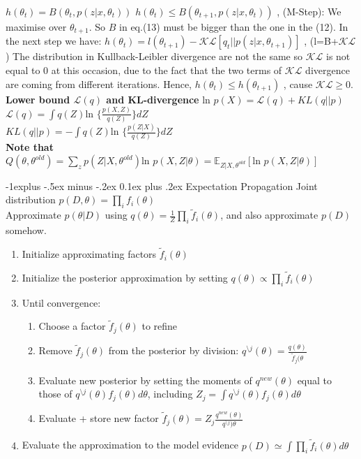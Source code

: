 \documentclass[9pt,landscape]{article}
\makeatletter
\renewcommand{\subsection}{\@startsection{subsection}{2}{0mm}%
                                {-1explus -.5ex minus -.2ex}%
                                {0.1ex plus .2ex}%
                                {\normalfont\scriptsize\bfseries}}
\makeatother
\begin{document}
\begin{multicols}{3}
$
 h(\theta_{t}) = B(\theta_{t},p(z|x,\theta_{t}))
$
$
h(\theta_{t}) \leq B(\theta_{t+1},p(z|x,\theta_{t}))
$
, (M-Step): We maximise over $\theta_{t+1}$. So $B$ in eq.(13) must be bigger than the one in the (12). In the next step we have:
$
h(\theta_{t}) = l(\theta_{t+1})-\mathcal{KL}[q_{t}||p(z|x,\theta_{t+1})]
$
, (l=B+$\mathcal{KL}$) The distribution in Kullback-Leibler divergence are not
the same so $\mathcal{KL}$ is not equal to $0$ at this occasion, due to the
fact that the two terms of $\mathcal{KL}$ divergence are coming from different iterations. Hence,
$
h(\theta_{t}) \leq h(\theta_{t+1})
$
, cause $\mathcal{KL} \geq 0$.\\
\textbf{Lower bound $\mathcal{L}(q)$ and KL-divergence}
$\text{ln } p(X) = \mathcal{L}(q) + KL(q||p)$\\
$\mathcal{L} (q) = \int q(Z) \text{ln } \big\{ \frac{p(X,Z)}{q(Z)} \big\} dZ$ \\
$KL(q||p) = - \int q(Z) \text{ln } \big \{ \frac{p(Z|X)}{q(Z)} \big\} dZ$\\
\textbf{Note that}\\
$Q(\theta,\theta^{old}) = \sum_z p(Z|X,\theta^{old}) \text{ln } p(X,Z|\theta) = \mathbb{E}_{Z|X,\theta^{old}}[\text{ln } p(X,Z|\theta)]$

\subsection{Expectation Propagation}
Joint distribution $p(D,\theta) = \prod_i f_i(\theta)$\\
Approximate $p(\theta|D)$ using $q(\theta) = \frac{1}{Z} \prod_i \tilde f_i(\theta)$, and also approximate $p(D)$ somehow.\\
\begin{enumerate}
\item Initialize approximating factors $\tilde f_i(\theta)$
\item Initialize the posterior approximation by setting $q(\theta)\varpropto \prod_i \tilde f_i(\theta)$
\item Until convergence:
\begin{enumerate}
\item Choose a factor $\tilde f_j(\theta)$ to refine
\item Remove $\tilde f_j(\theta)$ from the posterior by division: $q^{\setminus j}(\theta) = \frac{q(\theta)}{\tilde f_j(\theta}$
\item Evaluate new posterior by setting the moments of $q^{new}(\theta)$ equal to those of $q^{\setminus j}(\theta) f_j(\theta) d\theta$, including $Z_j = \int q^{\setminus j} (\theta) f_j(\theta) d\theta$
\item Evaluate + store new factor $\tilde f_j(\theta) = Z_j \frac{q^{new}(\theta)}{q^{\setminus j})\theta}$
\end{enumerate}
\item Evaluate the approximation to the model evidence $p(D) \simeq \int \prod_i \tilde f_i(\theta) d\theta$
\end{enumerate}



\end{multicols}
\end{document}
